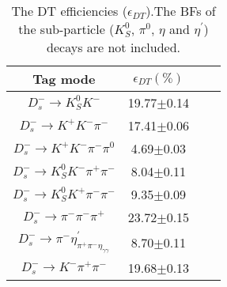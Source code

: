     \begin{table}[htbp]
        \caption{ The DT efficiencies ($\epsilon_{DT}$).The BFs of the sub-particle ($K_{S}^{0}$, $\pi^{0}$, $\eta$ and $\eta^{'}$) decays are not included.}
        \label{DT-eff}
        \begin{center}
            \begin{tabular}{cccc}
                \toprule\toprule
                Tag mode   & $\epsilon_{DT}(\%)$\\
                \hline
                $D_{s}^{-} \rightarrow K_{S}^{0}K^{-}$                                                   & 19.77$\pm$0.14\\
                $D_{s}^{-} \rightarrow K^{+}K^{-}\pi^{-}$                                                & 17.41$\pm$0.06\\
                $D_{s}^{-} \rightarrow K^{+}K^{-}\pi^{-}\pi^{0}$                                         &  4.69$\pm$0.03\\
                $D_{s}^{-} \rightarrow K_{S}^{0}K^{-}\pi^{+}\pi^{-}$                                     &  8.04$\pm$0.11\\
                $D_{s}^{-} \rightarrow K_{S}^{0}K^{+}\pi^{-}\pi^{-}$                                     &  9.35$\pm$0.09\\
                $D_{s}^{-} \rightarrow \pi^{-}\pi^{-}\pi^{+}$                                            & 23.72$\pm$0.15\\
                $D_{s}^{-} \rightarrow \pi^{-}\eta_{\pi^{+}\pi^{-}\eta_{\gamma\gamma}}^{'}$               &  8.70$\pm$0.11\\
                $D_{s}^{-} \rightarrow K^{-}\pi^{+}\pi^{-}$                                              & 19.68$\pm$0.13\\
                \bottomrule\bottomrule
            \end{tabular}
        \end{center}
    \end{table}

